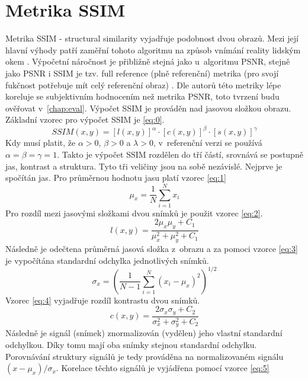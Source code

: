 \documentclass[thesis=M,czech]{FITthesis}[2016/06/26]
\begin{document}
\section{Metrika SSIM} \label{SSIM}
Metrika SSIM - structural similarity vyjadřuje podobnost dvou obrazů. Mezi její hlavní výhody patří zaměřní tohoto algoritmu na způsob vnímání reality lidským okem \cite{SSIM1}. Výpočetní náročnost je přibližně stejná jako u~algoritmu PSNR, stejně jako PSNR i SSIM je tzv. full reference (plně referenční) metrika (pro svojí fukčnost potřebuje mít celý referenční obraz) \cite{SSIM1}. Dle autorů této metriky lépe koreluje se subjektivním hodnocením než metrika PSNR, toto tvrzení budu ověřovat v~\autoref{chap:eval}.
Výpočet SSIM je prováděn nad jasovou složkou obrazu. Základní vzorec pro výpočet SSIM je \ref{eq:0}.
\begin{equation}  \label{eq:0}
\mathit{SSIM}(x, y) = [l(x, y)]^{\alpha}\cdot[c(x, y)]^\beta\cdot[s(x, y)]^\gamma
\end{equation}
Kdy musí platit, že $\alpha > 0$, $\beta > 0$ a $\lambda > 0$, v~referenční verzi se používá $\alpha = \beta = \gamma = 1$\cite{SSIM1}.
Takto je výpočet SSIM rozdělen do tří částí, srovnává se postupně jas, kontrast a struktura. Tyto tři veličiny jsou na sobě nezávislé. Nejprve je spočítán jas. Pro průměrnou hodnotu jasu platí vzorec \ref{eq:1}
\begin{equation} \label{eq:1}
\mu_x = \frac{1}{N}\sum_{i=1}^{N}x_i
\end{equation}
Pro rozdíl mezi jasovými složkami dvou snímků je použit vzorec \ref{eq:2}.
\begin{equation} \label{eq:2}
l(x, y) = \frac{2\mu_x \mu_y + C_1}{\mu^2_x+\mu^2_y+C_1}
\end{equation}
Následně je odečtena průměrná jasová složka z~obrazu a za pomoci vzorce \ref{eq:3} je vypočítána standardní odchylka jednotlivých snímků.
\begin{equation} \label{eq:3}
\sigma_x = \left(\frac{1}{N-1}\sum_{i=1}^{N}(x_i-\mu_x)^2\right)^{1/2}
\end{equation}
Vzorec \ref{eq:4} vyjadřuje rozdíl kontrastu dvou snímků.
\begin{equation}\label{eq:4}
c(x, y) = \frac{2\sigma_x \sigma_y + C_2}{\sigma^2_x+\sigma^2_y+C_2}
\end{equation}
Následně je signál (snímek) znormalizován (vydělen) jeho vlastní standardní odchylkou. Díky tomu mají oba snímky stejnou standardní odchylku. Porovnávání struktury signálů je tedy prováděna na normalizovaném signálu $(x-\mu_x)/\sigma_x$. Korelace těchto signálů je vyjádřena pomocí vzorce \ref{eq:5}
\end{document}
